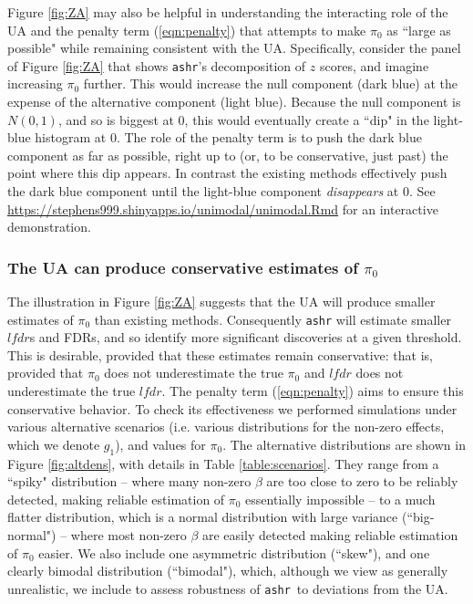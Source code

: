 \documentclass[11pt]{article}
\def\lfdr{\textit{lfdr}}
\def\ashr{{\tt ashr}\xspace}
\begin{document}
Figure \ref{fig:ZA} may also be helpful in understanding the interacting role of the UA and the penalty term (\ref{eqn:penalty}) that attempts to make $\pi_0$ as ``large as possible" while remaining consistent with the UA. Specifically, consider the panel of Figure \ref{fig:ZA} that shows \ashr's decomposition of $z$ scores, and imagine increasing $\pi_0$ further. This would increase the null component (dark blue) at the expense of
the alternative component (light blue). Because the null component is $N(0,1)$, and so is biggest at 0, this would eventually create a ``dip" in the light-blue histogram at 0. The role of the penalty term is to push the dark blue component as far as possible, right up to (or, to be conservative, just past) the point where this dip appears. In contrast the 
existing methods effectively push the dark blue component until the light-blue component {\it disappears} at 0. See \url{https://stephens999.shinyapps.io/unimodal/unimodal.Rmd} for an interactive demonstration.

 \subsubsection*{The UA can produce conservative estimates of $\pi_0$}

The illustration in Figure \ref{fig:ZA} suggests that the UA will produce smaller estimates of $\pi_0$ than existing methods.
Consequently \ashr will estimate smaller $\lfdr$s and FDRs, and so identify more significant discoveries at a given threshold. 
This is desirable, provided that these estimates remain conservative: that is,
provided that $\pi_0$ does not underestimate the true $\pi_0$ and $\lfdr$ does not underestimate the true $\lfdr$.
The penalty term (\ref{eqn:penalty}) aims to ensure this conservative behavior. To check its effectiveness
we performed simulations under various alternative scenarios (i.e. various distributions for the non-zero effects, which we denote $g_1$), and values
for $\pi_0$. The alternative distributions are shown in Figure \ref{fig:altdens}, with details in Table \ref{table:scenarios}.
They range from a ``spiky" distribution -- where many non-zero $\beta$ are
too close to  zero to be reliably detected, making reliable estimation of $\pi_0$ essentially impossible -- to a much
flatter distribution, which is a normal distribution with large variance (``big-normal") -- where most non-zero $\beta$ are easily detected
making reliable estimation of $\pi_0$ easier. We also include one asymmetric distribution (``skew"), and one clearly bimodal distribution (``bimodal"),
which, although we view as generally unrealistic, we include to assess robustness of \ashr~to deviations from the UA.
\end{document}
